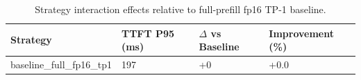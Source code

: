 \begin{table}
\caption{Strategy interaction effects relative to full-prefill fp16 TP-1 baseline.}
\label{tab:interactions}
\begin{tabular}{llll}
\toprule
Strategy & TTFT P95 (ms) & $\Delta$ vs Baseline & Improvement (\%) \\
\midrule
baseline\_full\_fp16\_tp1 & 197 & +0 & +0.0 \\
\bottomrule
\end{tabular}
\end{table}
